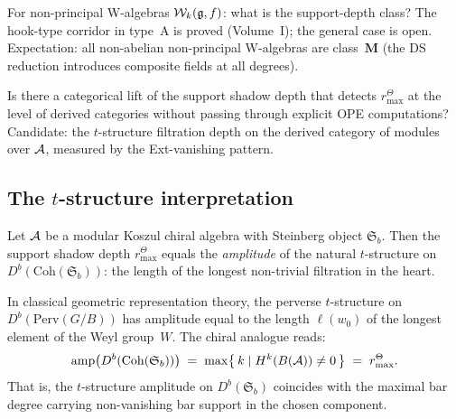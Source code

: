 \begin{openproblem}
For non-principal W-algebras $\mathcal{W}_k(\mathfrak{g}, f)$:
what is the support-depth class? The hook-type corridor
in type~A is proved
(Volume~I); the general case
is open. Expectation: all non-abelian non-principal
W-algebras are class~$\mathbf{M}$ (the DS reduction
introduces composite fields at all degrees).
\end{openproblem}

\begin{openproblem}
\label{open:thqg-categorical}
Is there a categorical lift of the support shadow depth that
detects \(r^\Theta_{\max}\) at the level of derived categories
without passing through explicit OPE computations?
Candidate: the $t$-structure filtration depth on the
derived category of modules over $\mathcal{A}$, measured by
the Ext-vanishing pattern.
\end{openproblem}


\subsection{The \texorpdfstring{$t$}{t}-structure interpretation}

\providecommand{\Steinberg}{\mathfrak{S}}

\begin{conjecture}
\label{conj:shadow-t-amplitude}
\ClaimStatusConjectured
Let $\mathcal{A}$ be a modular Koszul chiral algebra with
Steinberg object $\Steinberg_b$. Then the support shadow depth
\(r^\Theta_{\max}\) equals the \emph{amplitude} of the natural
$t$-structure on $D^b(\mathrm{Coh}(\Steinberg_b))$: the
length of the longest non-trivial filtration in the heart.

In classical geometric representation theory, the
perverse $t$-structure on $D^b(\mathrm{Perv}(G/B))$ has
amplitude equal to the length $\ell(w_0)$ of the longest
element of the Weyl group~$W$. The chiral analogue reads:
\[
 \mathrm{amp}\bigl(D^b(\mathrm{Coh}(\Steinberg_b))\bigr)
 \;=\;
 \max\bigl\{\, k \mid H^k(B(\cA)) \neq 0 \,\bigr\}
 \;=\;
 r^\Theta_{\max}.
\]
That is, the $t$-structure amplitude on $D^b(\Steinberg_b)$
coincides with the maximal bar degree carrying non-vanishing
bar support in the chosen component.
\end{conjecture}

